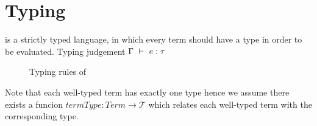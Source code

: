 \section{Typing}
\label{sec:typing}

\langname is a strictly typed language, in which every term should have a type in order to be evaluated.
Typing judgement $\Gamma~\vdash~e : \tau$

\begin{figure}[h]
\footnotesize

\caption{Typing rules of \langname}
\label{fig:typing}
\end{figure}

Note that each well-typed term has exactly one type hence we assume there
exists a funcion $termType: Term \to \mathcal{T}$ which relates each well-typed
term with the corresponding type.